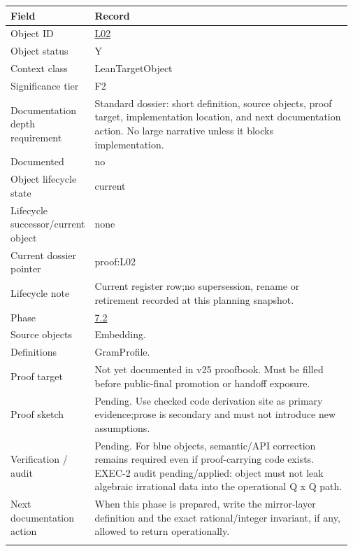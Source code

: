 \begin{longtable}{L{0.16\linewidth} L{0.81\linewidth}}
\hline
\textbf{Field} & \textbf{Record}\\
\hline
Object ID & \hyperlink{object-row-L02}{L02}\\
\hline\addlinespace[0.20em]
Object status & Y\\
\hline\addlinespace[0.20em]
Context class & LeanTargetObject\\
\hline\addlinespace[0.20em]
Significance tier & F2\\
\hline\addlinespace[0.20em]
Documentation depth requirement & Standard dossier: short definition, source objects, proof target, implementation location, and next documentation action. No large narrative unless it blocks implementation.\\
\hline\addlinespace[0.20em]
Documented & no\\
\hline\addlinespace[0.20em]
Object lifecycle state & current\\
\hline\addlinespace[0.20em]
Lifecycle successor/\allowbreak{}current object & none\\
\hline\addlinespace[0.20em]
Current dossier pointer & proof:L02\\
\hline\addlinespace[0.20em]
Lifecycle note & Current register row;\newline no supersession, rename or retirement recorded at this planning snapshot.\\
\hline\addlinespace[0.20em]
Phase & \hyperlink{phase-row-7-2}{7.2}\\
\hline\addlinespace[0.20em]
Source objects & Embedding.\\
\hline\addlinespace[0.20em]
Definitions & GramProfile.\\
\hline\addlinespace[0.20em]
Proof target & Not yet documented in v25 proofbook. Must be filled before public-final promotion or handoff exposure.\\
\hline\addlinespace[0.20em]
Proof sketch & Pending. Use checked code derivation site as primary evidence;\newline prose is secondary and must not introduce new assumptions.\\
\hline\addlinespace[0.20em]
Verification /\allowbreak{} audit & Pending. For blue objects, semantic/\allowbreak{}API correction remains required even if proof-carrying code exists. EXEC-2 audit pending/\allowbreak{}applied: object must not leak algebraic irrational data into the operational Q x Q path.\\
\hline\addlinespace[0.20em]
Next documentation action & When this phase is prepared, write the mirror-layer definition and the exact rational/\allowbreak{}integer invariant, if any, allowed to return operationally.\\
\hline\addlinespace[0.20em]
\end{longtable}
